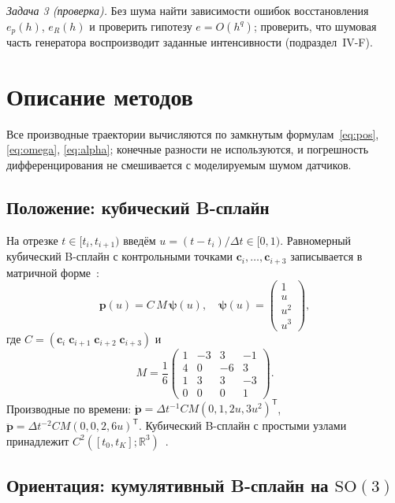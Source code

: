 \documentclass{misisarticle}
\newcommand{\R}{\mathbb{R}}
\newcommand{\SO}{\mathrm{SO}(3)}
\newcommand{\T}{^{\mathsf{T}}}
\newcommand{\vb}[1]{\mathbf{#1}}
\begin{document}
\textit{Задача 3 (проверка).} Без шума найти зависимости ошибок восстановления $e_p(h)$, $e_R(h)$ и проверить гипотезу $e=O(h^q)$; проверить, что шумовая часть генератора воспроизводит заданные интенсивности (подраздел~IV-F).

\section{Описание методов}

Все производные траектории вычисляются по замкнутым формулам~\eqref{eq:pos}, \eqref{eq:omega}, \eqref{eq:alpha}; конечные разности не используются, и погрешность дифференцирования не смешивается с моделируемым шумом датчиков.

\subsection{Положение: кубический B-сплайн}

На отрезке $t\in[t_i,t_{i+1})$ введём $u=(t-t_i)/\Delta t\in[0,1)$. Равномерный кубический B-сплайн с контрольными точками $\vb c_i,\dots,\vb c_{i+3}$ записывается в матричной форме~\cite{patronperez}:
\begin{equation}
  \vb p(u)=C\,M\,\boldsymbol\psi(u),\quad
  \boldsymbol\psi(u)=\begin{pmatrix}1\\u\\u^2\\u^3\end{pmatrix},
  \label{eq:pos}
\end{equation}
где $C=(\vb c_i\;\vb c_{i+1}\;\vb c_{i+2}\;\vb c_{i+3})$ и
\begin{equation*}
  M=\frac16\begin{pmatrix}
    1 & -3 & 3 & -1\\
    4 & 0 & -6 & 3\\
    1 & 3 & 3 & -3\\
    0 & 0 & 0 & 1
  \end{pmatrix}.
\end{equation*}
Производные по времени: $\dot{\vb p}=\Delta t^{-1}C M(0,1,2u,3u^2)\T$, $\ddot{\vb p}=\Delta t^{-2}C M(0,0,2,6u)\T$. Кубический B-сплайн с простыми узлами принадлежит $C^2([t_0,t_K];\R^3)$~\cite{deboor}.

\subsection{Ориентация: кумулятивный B-сплайн на $\SO$}
\end{document}
